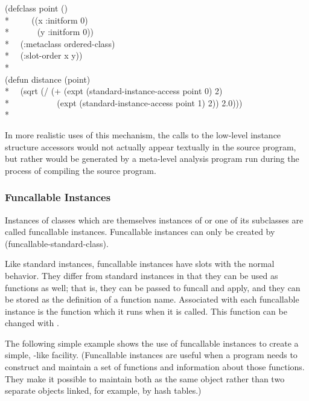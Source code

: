 \begin{lisp}
(defclass point ()\\*
~~~~ ((x :initform 0)\\*
~~~~~~(y :initform 0))\\*
~~(:metaclass ordered-class)\\*
~~(:slot-order x y))\\*
\\
(defun distance (point)\\*
~~(sqrt (/ (+ (expt (standard-instance-access point 0) 2)\\*
~~~~~~~~~~ (expt (standard-instance-access point 1) 2)) 2.0)))\\*
\end{lisp}

In more realistic uses of this mechanism, the calls to the low-level instance
structure accessors would not actually appear textually in the source program,
but rather would be generated by a meta-level analysis program run during the
process of compiling the source program. 

\subsubsection{Funcallable Instances}
\label{FUNCALLABLE-INSTANCES}

Instances of classes which are themselves instances of
 or one of its subclasses are called funcallable
instances. Funcallable instances can only be created by 
(funcallable-standard-class). 

Like standard instances, funcallable instances have slots with the normal
behavior. They differ from standard instances in that they can be used as
functions as well; that is, they can be passed to funcall and apply, and they
can be stored as the definition of a function name. Associated with each
funcallable instance is the function which it runs when it is called. This
function can be changed with . 

The following simple example shows the use of funcallable instances to create a
simple, -like facility. (Funcallable instances are useful when a
program needs to construct and maintain a set of functions and information about
those functions. They make it possible to maintain both as the same object
rather than two separate objects linked, for example, by hash tables.) 

